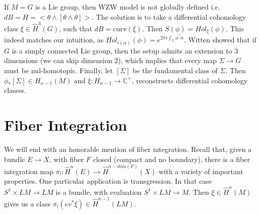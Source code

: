 \documentclass[10pt]{amsart}
\newcommand{\bC}{\mathbb{C}}
\newcommand{\curv}{\mathrm{curv}}
\begin{document}
If $M = G$ is a Lie group, then WZW model is not globally defined i.e. $dB = H = <\theta \wedge [\theta \wedge \theta]>$. The solution is to take a differential cohomology class $\xi \in \hat{H}^3(G)$, such that  $dB = \curv(\xi)$. Then $S(\phi) = Hol_\xi(\phi)$. This indeed matches our intuition, as $Hol_{i(\alpha)}(\phi) = e^{2\pi i \int_\Sigma \phi^*\alpha}$. Witten showed that if $G$ is a simply connected Lie group, then the setup admits an extension to $3$ dimensions (we can skip dimension $2$), which implies that every map $\Sigma \to G$ must be nul-homotopic. Finally, let $[\Sigma]$ be the fundamental class of $\Sigma$. Then $\phi_*[\Sigma] \in H_{n-1}(M)$ and $\xi\colon H_{n-1} \to \bC^\times$, reconstructs differential cohomology classes.

\section{Fiber Integration} 
We will end with an honorable mention of fiber integration. Recall that, given a bundle $E \to X$, with fiber $F$ closed (compact and no boundary), there is a fiber integration map $\pi_!\colon \hat{H}^n(E) \to \hat{H}^{n-dim(F)}(X)$ with a variety of important properties. One particular application is transgression. In that case $S^1 \times LM \to LM$ is a bundle, with evaluation $S^1 \times LM \to M$. Then $\xi \in \hat{H}^n(M)$ gives us a class $\pi_!(ev^*\xi) \in \hat{H}^{n-1}(LM)$.


{\footnotesize


}
\end{document}

